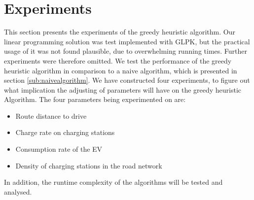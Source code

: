 \section{Experiments}
\label{sec:experiments}
This section presents the experiments of the greedy heuristic algorithm. Our linear programming solution was test implemented with GLPK, but the practical usage of it was not found plausible, due to overwhelming running times. Further experiments were therefore omitted. We test the performance of the greedy heuristic algorithm in comparison to a naive algorithm, which is presented in section \ref{sub:naivealgorithm}. We have constructed four experiments, to figure out what implication the adjusting of parameters will have on the greedy heuristic Algorithm. The four parameters being experimented on are:

\begin{itemize}
     \item Route distance to drive
     \item Charge rate on charging stations
     \item Consumption rate of the EV
     \item Density of charging stations in the road network
 \end{itemize} 

In addition, the runtime complexity of the algorithms will be tested and analysed.  



















